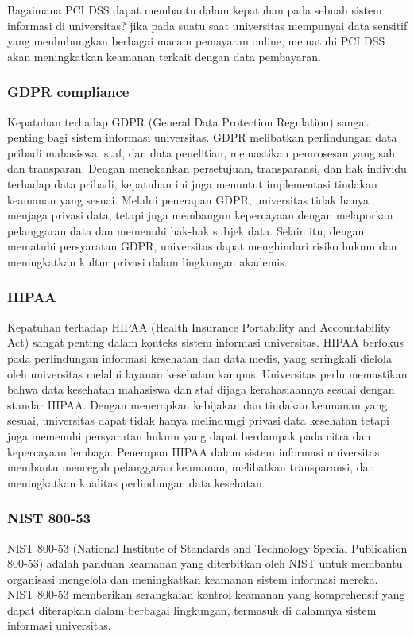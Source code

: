 \documentclass[12pt]{article}
\begin{document}
Bagaimana PCI DSS dapat membantu dalam kepatuhan pada sebuah sistem informasi di universitas?  jika pada suatu saat universitas mempunyai data sensitif yang menhubungkan berbagai macam pemayaran online, mematuhi PCI DSS akan meningkatkan keamanan terkait dengan data pembayaran.
    
\subsubsection*{GDPR compliance}
Kepatuhan terhadap GDPR (General Data Protection Regulation) sangat penting bagi sistem informasi universitas. GDPR melibatkan perlindungan data pribadi mahasiswa, staf, dan data penelitian, memastikan pemrosesan yang sah dan transparan. Dengan menekankan persetujuan, transparansi, dan hak individu terhadap data pribadi, kepatuhan ini juga menuntut implementasi tindakan keamanan yang sesuai. Melalui penerapan GDPR, universitas tidak hanya menjaga privasi data, tetapi juga membangun kepercayaan dengan melaporkan pelanggaran data dan memenuhi hak-hak subjek data. Selain itu, dengan mematuhi persyaratan GDPR, universitas dapat menghindari risiko hukum dan meningkatkan kultur privasi dalam lingkungan akademis.

\subsubsection*{HIPAA}
Kepatuhan terhadap HIPAA (Health Insurance Portability and Accountability Act) sangat penting dalam konteks sistem informasi universitas. HIPAA berfokus pada perlindungan informasi kesehatan dan data medis, yang seringkali dielola oleh universitas melalui layanan kesehatan kampus. Universitas perlu memastikan bahwa data kesehatan mahasiswa dan staf dijaga kerahasiaannya sesuai dengan standar HIPAA. Dengan menerapkan kebijakan dan tindakan keamanan yang sesuai, universitas dapat tidak hanya melindungi privasi data kesehatan tetapi juga memenuhi persyaratan hukum yang dapat berdampak pada citra dan kepercayaan lembaga. Penerapan HIPAA dalam sistem informasi universitas membantu mencegah pelanggaran keamanan, melibatkan transparansi, dan meningkatkan kualitas perlindungan data kesehatan.
\subsubsection*{NIST 800-53}
NIST 800-53 (National Institute of Standards and Technology Special Publication 800-53) adalah panduan keamanan yang diterbitkan oleh NIST untuk membantu organisasi mengelola dan meningkatkan keamanan sistem informasi mereka. NIST 800-53 memberikan serangkaian kontrol keamanan yang komprehensif yang dapat diterapkan dalam berbagai lingkungan, termasuk di dalamnya sistem informasi universitas.
\end{document}
